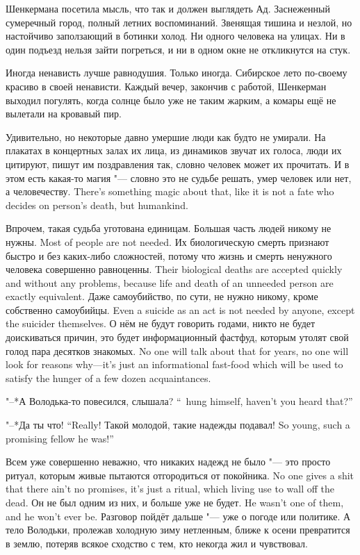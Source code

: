 Шенкермана посетила мысль, что так и должен выглядеть Ад.
Заснеженный сумеречный город, полный летних воспоминаний.
Звенящая тишина и незлой, но настойчиво заползающий в ботинки холод.
Ни одного человека на улицах.
Ни в один подъезд нельзя зайти погреться, и ни в одном окне не откликнутся на стук.

Иногда ненависть лучше равнодушия.
Только иногда.
Сибирское лето по-своему красиво в своей ненависти.
Каждый вечер, закончив с работой, Шенкерман выходил погулять, когда солнце было уже не таким жарким, а комары ещё не вылетали на кровавый пир.

Удивительно, но некоторые давно умершие люди как будто не умирали.
На плакатах в концертных залах их лица, из динамиков звучат их голоса, люди их цитируют, пишут им поздравления так, словно человек может их прочитать.
{И в этом есть какая-то магия "--- словно это не судьбе решать, умер человек или нет, а человечеству.}
{There's something magic about that, like it is not a fate who decides on person's death, but humankind.}

Впрочем, такая судьба уготована единицам.
{Большая часть людей никому не нужны.}
{Most of people are not needed.}
{Их биологическую смерть признают быстро и без каких-либо сложностей, потому что жизнь и смерть ненужного человека совершенно равноценны.}
{Their biological deaths are accepted quickly and without any problems, because life and death of an unneeded person are exactly equivalent.}
{Даже самоубийство, по сути, не нужно никому, кроме собственно самоубийцы.}
{Even a suicide as an act is not needed by anyone, except the suicider themselves.}
{О нём не будут говорить годами, никто не будет доискиваться причин, это будет информационный фастфуд, которым утолят свой голод пара десятков знакомых.}
{No one will talk about that for years, no one will look for reasons why---it's just an informational fast-food which will be used to satisfy the hunger of a few dozen acquaintances.}

{"--*А Володька-то повесился, слышала?}
{``\Volodka\ hung himself, haven't you heard that?''}

{"--*Да ты что!}
{``Really!}
{Такой молодой, такие надежды подавал!}
{So young, such a promising fellow he was!''}

{Всем уже совершенно неважно, что никаких надежд не было "--- это просто ритуал, которым живые пытаются отгородиться от покойника.}
{No one gives a shit that there ain't no promises, it's just a ritual, which living use to wall off the dead.}
{Он не был одним из них, и больше уже не будет.}
{He wasn't one of them, and he won't ever be.}
Разговор пойдёт дальше "--- уже о погоде или политике.
А тело Володьки, пролежав холодную зиму нетленным, ближе к осени превратится в землю, потеряв всякое сходство с тем, кто некогда жил и чувствовал.

